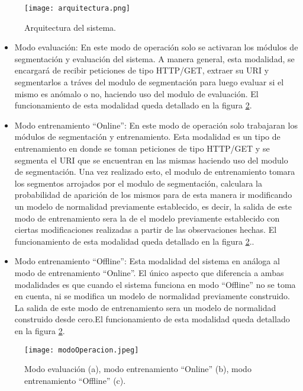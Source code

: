 \begin{figure}[tb]
\begin{center}
\texttt{[image: arquitectura.png]}
\caption{Arquitectura del sistema.}
\label{fig:arquitectura}
\end{center}
\end{figure}

\begin{itemize}
\item Modo evaluación: En este modo de operación solo se activaran los módulos de segmentación y evaluación del sistema. A manera general, esta modalidad, se encargará de recibir peticiones de tipo HTTP/GET, extraer su URI y segmentarlos a tráves del modulo de segmentación para luego evaluar si  el mismo es anómalo o no, haciendo uso del modulo de evaluación. El funcionamiento de esta modalidad queda detallado en la figura \ref{fig:modoSistema}.
\item Modo entrenamiento ``Online'': En este modo de operación solo trabajaran los módulos de segmentación y entrenamiento. Esta modalidad es un tipo de entrenamiento en donde se toman peticiones de tipo HTTP/GET y se segmenta el URI que se encuentran en las mismas haciendo uso del modulo de segmentación. Una vez realizado esto, el modulo de entrenamiento tomara los segmentos arrojados por el modulo de segmentación, calculara la probabilidad de aparición de los mismos para de esta manera ir modificando un modelo de normalidad previamente establecido, es decir, la salida de este modo de entrenamiento sera la de el modelo previamente establecido con ciertas modificaciones realizadas a partir de las observaciones hechas. El funcionamiento de esta modalidad queda detallado en la figura \ref{fig:modoSistema}..
\item Modo entrenamiento ``Offline'': Esta modalidad del sistema en análoga al modo de entrenamiento ``Online''. El único aspecto que diferencia a ambas modalidades es que cuando el sistema funciona en modo ``Offline'' no se toma en cuenta, ni se modifica un modelo de normalidad previamente construido. La salida de este modo de entrenamiento sera un modelo de normalidad construido desde cero.El funcionamiento de esta modalidad queda detallado en la figura \ref{fig:modoSistema}.
\end{itemize}

\begin{figure}[tb]
\begin{center}
\texttt{[image: modoOperacion.jpeg]}
\caption{Modo evaluación (a), modo entrenamiento ``Online'' (b), modo entrenamiento ``Offline'' (c).}
\label{fig:modoSistema}
\end{center}
\end{figure}

